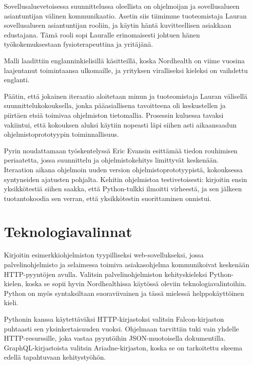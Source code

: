 Sovellusaluevetoisessa suunnittelussa oleellista on ohjelmoijan ja
sovellusalueen asiantuntijan välinen kommunikaatio. Asetin siis tiimimme
tuoteomistaja Lauran sovellusalueen asiantuntijan rooliin, ja käytin
häntä kuvitteellisen asiakkaan edustajana. Tämä rooli sopi Lauralle
erinomaisesti johtuen hänen työkokemuksestaan fysioterapeuttina ja
yritäjänä.

Malli laadittiin englanninkielisillä käsitteillä, koska Nordhealth on
viime vuosina laajentanut toimintaansa ulkomaille, ja yrityksen
viralliseksi kieleksi on vaihdettu englanti.

Päätin, että jokainen iteraatio aloitetaan minun ja tuoteomistaja Lauran
välisellä suunnittelukokouksella, jonka pääasiallisena tavoitteena oli
keskustellen ja piirtäen etsiä toimivaa ohjelmiston tietomallia.
Prosessin kuluessa tavaksi vakiintui, että kokouksen aluksi käytiin
nopeasti läpi siihen asti aikaansaadun ohjelmistoprototyypin
toiminnallisuus.

Pyrin noudattamaan työskentelyssä Eric Evansin esittämää tiedon
rouhimisen periaatetta, jossa suunnittelu ja ohjelmistokehitys
limittyvät keskenään. Iteraation aikana ohjelmoin uuden version
ohjelmistoprototyypistä, kokouksessa syntyneiden ajatusten pohjalta.
Kehitin ohjelmistoa testivetoisesti: kirjoitin ensin yksikkötestiä
siihen saakka, että Python-tulkki ilmoitti virheestä, ja sen jälkeen
tuotantokoodia sen verran, että yksikkötestin suorittaminen onnistui.

\hypertarget{teknologiavalinnat}{%
\section{Teknologiavalinnat}\label{teknologiavalinnat}}

Kirjoitin esimerkkiohjelmiston tyypilliseksi web-sovellukseksi, jossa
palvelinohjelmisto ja selaimessa toimiva asiakasohjelma kommunikoivat
keskenään HTTP-pyyntöjen avulla. Valitsin palvelinohjelmiston
kehityskieleksi Python-kielen, koska se sopii hyvin Nordhealthissa
käytössä oleviin teknologiavalintoihin. Python on myös syntaksiltaan
suoraviivainen ja tässä mielessä helppokäyttöinen kieli.

Pythonin kanssa käytettäväksi HTTP-kirjastoksi valitsin Falcon-kirjaston
puhtaasti sen yksinkertaisuuden vuoksi. Ohjelmaan tarvittiin tuki vain
yhdelle HTTP-resurssille, joka vastaa pyyntöihin JSON-muotoisella
dokumentilla. GraphQL-kirjastoista valitsin Ariadne-kirjaston, koska se
on tarkoitettu skeema edellä tapahtuvaan kehitystyöhön.

